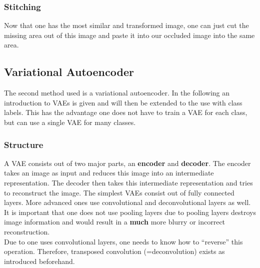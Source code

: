 \documentclass[
     11pt,         %
     a4paper,      %
     oneside,
     ]{article}
\begin{document}
\subsubsection{Stitching}
Now that one has the most similar and transformed image, one can just cut the missing area out of this image and paste it into our occluded image into the same area.

\subsection{Variational Autoencoder}
The second method used is a variational autoencoder. In the following an introduction to VAEs is given and will then be extended to the use with class labels. This has the advantage one does not have to train a VAE for each class, but can use a single VAE for many classes.
\subsubsection{Structure}
A VAE consists out of two major parts, an \textbf{encoder} and \textbf{decoder}. The encoder takes an image as input and reduces this image into an intermediate representation. The decoder then takes this intermediate representation and tries to reconstruct the image. The simplest VAEs consist out of fully connected layers. More advanced ones use convolutional and deconvolutional layers as well. It is important that one does not use pooling layers due to pooling layers destroys image information and would result in a \textbf{much} more blurry or incorrect reconstruction. \\
Due to one uses convolutional layers, one needs to know how to \enquote{reverse} this operation. Therefore, transposed convolution (=deconvolution) exists as introduced beforehand. \cite{VAE}
\end{document}
